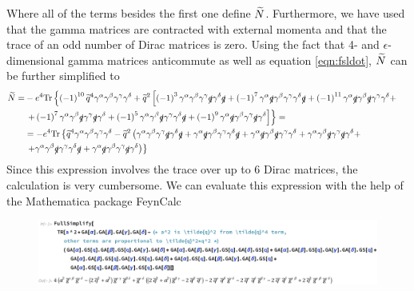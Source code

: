 Where all of the terms besides the first one define $\widetilde{N}$. Furthermore, we have used that the gamma matrices are contracted with external momenta and that the trace of an odd number of Dirac matrices is zero. Using the fact that 4- and $\epsilon$-dimensional gamma matrices anticommute as well as equation \ref{eqn:fsldot}, $\widetilde{N}$ can be further simplified to
\begin{align*}
\widetilde{N} = & -e^4 \mathrm{Tr} \left\lbrace \left( -1 \right)^{10} \widetilde{q}^4 \gamma^{\alpha} \gamma^{\beta} \gamma^{\gamma} \gamma^{\delta} + \widetilde{q}^2 \left[ \left( -1 \right) ^3  \gamma^{\alpha} \gamma^{\beta} \gamma^{\gamma} \slashed{q} \gamma^{\delta} \slashed{q}  + \left( -1 \right)^7 \gamma^{\alpha} \slashed{q} \gamma^{\beta} \gamma^{\gamma} \gamma^{\delta} \slashed{q} + \left( -1 \right)^{11} \gamma^{\alpha} \slashed{q} \gamma^{\beta} \slashed{q} \gamma^{\gamma} \gamma^{\delta} + \right. \right. & \\
& \left. \left. + \left( -1 \right)^7 \gamma^{\alpha} \gamma^{\beta} \slashed{q} \gamma^{\gamma} \slashed{q} \gamma^{\delta} + \left( -1 \right)^5 \gamma^{\alpha} \gamma^{\beta} \slashed{q} \gamma^{\gamma} \gamma^{\delta} \slashed{q} + \left( -1 \right)^9 \gamma^{\alpha} \slashed{q} \gamma^{\beta} \gamma^{\gamma} \slashed{q} \gamma^{\delta} \right] \right\rbrace = & \\
& = -e^4 \mathrm{Tr} \left\lbrace \widetilde{q}^4 \gamma^{\alpha} \gamma^{\beta} \gamma^{\gamma} \gamma^{\delta} - \widetilde{q}^2 \left( \gamma^{\alpha} \gamma^{\beta} \gamma^{\gamma} \slashed{q} \gamma^{\delta} \slashed{q} + \gamma^{\alpha} \slashed{q} \gamma^{\beta} \gamma^{\gamma} \gamma^{\delta} \slashed{q} + \gamma^{\alpha} \slashed{q} \gamma^{\beta} \slashed{q} \gamma^{\gamma} \gamma^{\delta} + \gamma^{\alpha} \gamma^{\beta} \slashed{q} \gamma^{\gamma} \slashed{q} \gamma^{\delta} + \right. \right. & \\
& \left. \left. + \gamma^{\alpha} \gamma^{\beta} \slashed{q} \gamma^{\gamma} \gamma^{\delta} \slashed{q} + \gamma^{\alpha} \slashed{q} \gamma^{\beta} \gamma^{\gamma} \slashed{q} \gamma^{\delta} \right) \right\rbrace &
\end{align*}
Since this expression involves the trace over up to 6 Dirac matrices, the calculation is very cumbersome. We can evaluate this expression with the help of the Mathematica package FeynCalc \cite{FeynCalc,FeynCalc2} 
\begin{figure}[h!]
  \begin{center}
    \includegraphics[width=1.05\textwidth]{Figures/Trace_4ptfct_Mathematica}
  \end{center}
  \setlength{\belowcaptionskip}{-20pt}
  \caption*{}
\end{figure} \\
